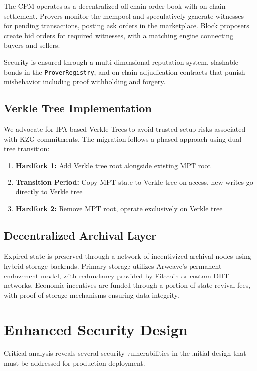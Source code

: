\documentclass{article}
\begin{document}
The CPM operates as a decentralized off-chain order book with on-chain settlement. Provers monitor the mempool and speculatively generate witnesses for pending transactions, posting ask orders in the marketplace. Block proposers create bid orders for required witnesses, with a matching engine connecting buyers and sellers.

Security is ensured through a multi-dimensional reputation system, slashable bonds in the \texttt{ProverRegistry}, and on-chain adjudication contracts that punish misbehavior including proof withholding and forgery.

\subsection{Verkle Tree Implementation}

We advocate for IPA-based Verkle Trees to avoid trusted setup risks associated with KZG commitments. The migration follows a phased approach using dual-tree transition:

\begin{enumerate}
\item \textbf{Hardfork 1:} Add Verkle tree root alongside existing MPT root
\item \textbf{Transition Period:} Copy MPT state to Verkle tree on access, new writes go directly to Verkle tree
\item \textbf{Hardfork 2:} Remove MPT root, operate exclusively on Verkle tree
\end{enumerate}

\subsection{Decentralized Archival Layer}

Expired state is preserved through a network of incentivized archival nodes using hybrid storage backends. Primary storage utilizes Arweave's permanent endowment model, with redundancy provided by Filecoin or custom DHT networks. Economic incentives are funded through a portion of state revival fees, with proof-of-storage mechanisms ensuring data integrity.

\section{Enhanced Security Design}

Critical analysis reveals several security vulnerabilities in the initial design that must be addressed for production deployment.
\end{document}
